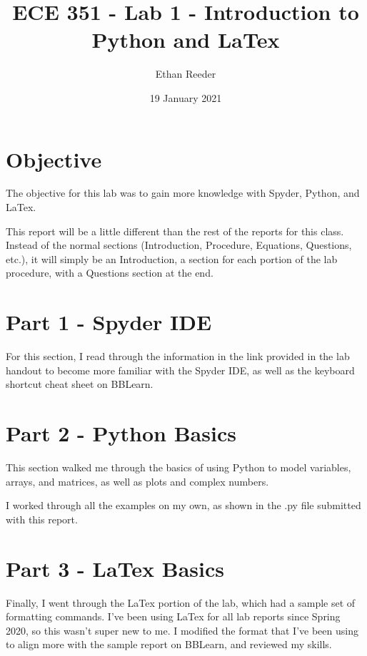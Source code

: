 \documentclass[12pt]{article}
\title{ECE 351 - Lab 1 - Introduction to Python and LaTex}
\author{Ethan Reeder}
\date{19 January 2021}
\begin{document}
\lstset{language=C}

\maketitle

\newpage

\tableofcontents

\newpage

\section{Objective}

The objective for this lab was to gain more knowledge with Spyder, Python, and LaTex.

This report will be a little different than the rest of the reports for this class. Instead of the normal sections (Introduction, Procedure, Equations, Questions, etc.), it will simply be an Introduction, a section for each portion of the lab procedure, with a Questions section at the end.

\section{Part 1 - Spyder IDE}

For this section, I read through the information in the link provided in the lab handout to become more familiar with the Spyder IDE, as well as the keyboard shortcut cheat sheet on BBLearn.

\section{Part 2 - Python Basics}

This section walked me through the basics of using Python to model variables, arrays, and matrices, as well as plots and complex numbers.

I worked through all the examples on my own, as shown in the .py file submitted with this report.

\section{Part 3 - LaTex Basics}

Finally, I went through the LaTex portion of the lab, which had a sample set of formatting commands. I've been using LaTex for all lab reports since Spring 2020, so this wasn't super new to me. I modified the format that I've been using to align more with the sample report on BBLearn, and reviewed my skills.
\end{document}

